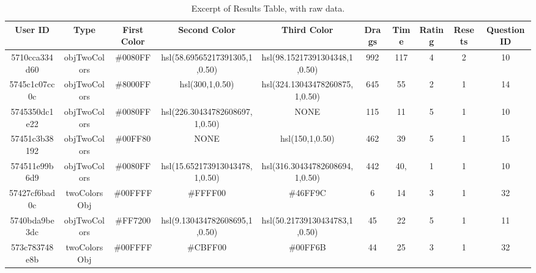 \begin{table}[htbp]
  \resizebox{\textwidth}{!} {
  \begin{tabular} {|c|c|c|c|c|c|c|c|c|c|}
    \hline
    User ID & Type & First Color & Second Color & Third Color & Drags & Time & Rating & Resets & Question ID \\ \hline \hline
    5710cca334d60 & objTwoColors & \#0080FF & hsl(58.69565217391305,1,0.50) & hsl(98.15217391304348,1,0.50) & 992 & 117 & 4 & 2 & 10 \\ \hline
    5745c1c07cc0c & objTwoColors & \#8000FF & hsl(300,1,0.50) & hsl(324.13043478260875,1,0.50) & 645 & 55 & 2 & 1 & 14 \\ \hline
    5745350dc1e22 & objTwoColors & \#0080FF & hsl(226.30434782608697,1,0.50) & NONE & 115 & 11 & 5 & 1 & 10 \\ \hline
    57451c3b38192 & objTwoColors & \#00FF80 & NONE & hsl(150,1,0.50) & 462 & 39 & 5 & 1 & 15 \\ \hline
    574511e99b6d9 & objTwoColors & \#0080FF & hsl(15.652173913043478,1,0.50) & hsl(316.30434782608694,1,0.50) & 442 & 40, & 1 & 1 & 10 \\ \hline
    57427cf6bad0c & twoColorsObj & \#00FFFF & \#FFFF00 & \#46FF9C & 6 & 14 & 3 & 1 & 32 \\ \hline
    5740bda9be3dc & objTwoColors & \#FF7200 & hsl(9.130434782608695,1,0.50) & hsl(50.21739130434783,1,0.50) & 45 & 22 & 5 & 1 & 11 \\ \hline
    573c783748e8b & twoColorsObj & \#00FFFF & \#CBFF00 & \#00FF6B & 44 & 25 & 3 & 1 & 32 \\
    \hline
  \end{tabular}}
  \caption[Excerpt of Raw "Results" Table]{Excerpt of Results Table, with raw data.}
  \label{table:csv_resultsraw}
\end{table} \par
%
